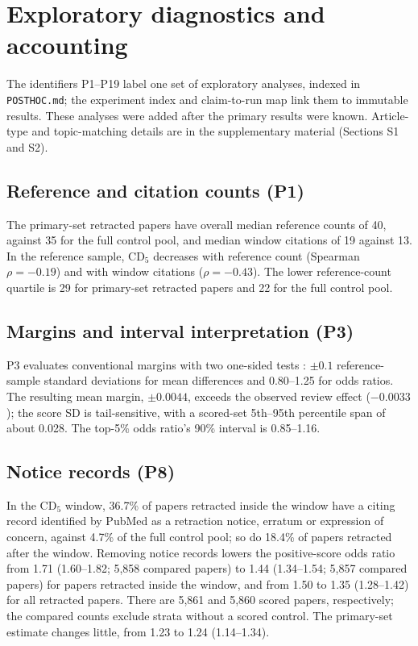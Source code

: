 \appendix
\setcounter{table}{0}
\renewcommand{\theHtable}{\theHsection.\arabic{table}}
\section{Exploratory diagnostics and accounting}\label{sec:appendix}
The identifiers P1--P19 label one set of exploratory analyses, indexed in \texttt{POSTHOC.md}; the experiment index and
claim-to-run map link them to immutable results. These analyses were added after the primary results were known. Article-type and topic-matching details are in
the supplementary material (Sections S1 and S2).

\subsection{Reference and citation counts (P1)}
The primary-set retracted papers have overall median reference counts of 40, against 35 for the full control pool,
and median window citations of 19 against 13. In the reference sample, CD$_5$ decreases with reference count
(Spearman $\rho=-0.19$) and with window
citations ($\rho=-0.43$). The lower reference-count quartile is 29 for primary-set retracted papers and 22 for
the full control pool.

\subsection{Margins and interval interpretation (P3)}
P3 evaluates conventional margins with two one-sided tests
\citep{schuirmann1987tost,lakens2017equivalence}: $\pm0.1$ reference-sample standard deviations for mean differences
and 0.80--1.25 for odds ratios. The resulting mean margin, $\pm0.0044$, exceeds the observed review effect
($-0.0033$); the score SD is tail-sensitive, with a scored-set 5th--95th percentile span of about 0.028.
The top-5\% odds ratio's 90\% interval is
0.85--1.16.

\subsection{Notice records (P8)}
In the CD$_5$ window, 36.7\% of papers retracted inside the window have a citing record identified by PubMed as a
retraction notice, erratum or expression of concern, against 4.7\% of the full control pool; so do 18.4\% of papers
retracted after the window. Removing notice records lowers the positive-score odds ratio from 1.71 (1.60--1.82;
5,858 compared papers) to 1.44 (1.34--1.54; 5,857 compared papers) for papers retracted inside the window,
and from 1.50 to 1.35 (1.28--1.42) for all retracted papers. There are 5,861 and 5,860 scored papers, respectively;
the compared counts exclude strata without a scored control. The primary-set estimate changes little,
from 1.23 to 1.24 (1.14--1.34).

